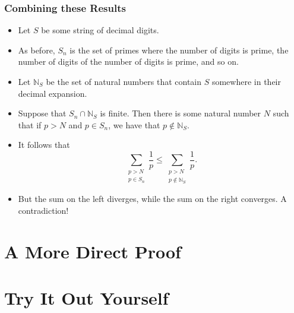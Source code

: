\documentclass{beamer}
\begin{document}
\begin{frame}
    \frametitle{Combining these Results}

    \begin{itemize}
        \item Let $S$ be some string of decimal digits. \pause
        \item As before, $S_n$ is the set of primes where the number of digits is prime, the number of digits of the number of digits is prime, and so on. \pause
        \item Let $\mathbb{N}_S$ be the set of natural numbers that contain $S$ somewhere in their decimal expansion. \pause
        \item Suppose that $S_n \cap \mathbb{N}_S$ is finite. Then there is some natural number $N$ such that if $p > N$ and $p \in S_n$, we have that $p \not\in \mathbb{N}_S$. \pause
        \item It follows that
        \[
            \sum_{\substack{p > N\\ p \in S_n}} \frac{1}{p} \leq \sum_{\substack{p > N\\ p \not\in \mathbb{N}_S}} \frac{1}{p}.
        \]
        \pause
        \item But the sum on the left diverges, while the sum on the right converges. A contradiction!
    \end{itemize}

\end{frame}

\section{A More Direct Proof}

\section{Try It Out Yourself}
\end{document}
